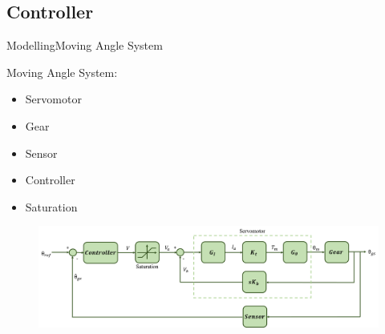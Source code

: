 \subsection{Controller}
%
%
%
%  
%
%
%
%

\begin{frame}{Modelling}{Moving Angle System}
  \begin{block}{Moving Angle System:}

	  \begin{itemize}
  	  	\item Servomotor
	  	\item Gear
	  	\item Sensor
	  	\item Controller
	  	\item Saturation
	  \end{itemize}

	  \begin{figure}
        \includegraphics[scale=0.24]{../report/figures/complete_model.png}
      \end{figure}
  
  \end{block}
\end{frame}


